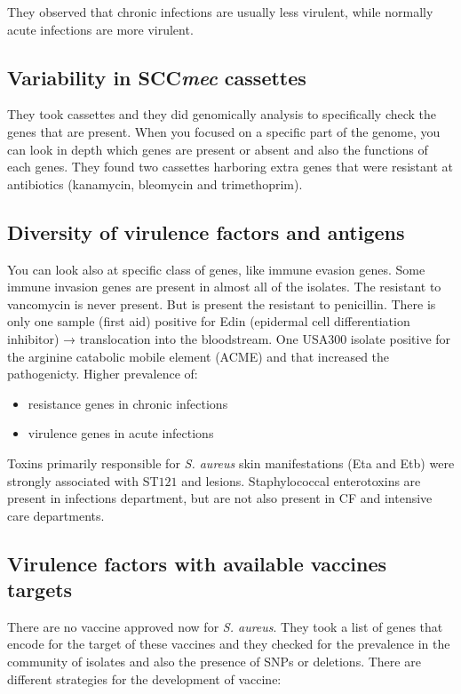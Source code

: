 They observed that chronic infections are usually less virulent, while normally acute infections are more virulent. 

\subsection{Variability in SCC\emph{mec} cassettes}

They took cassettes and they did genomically analysis to specifically check the genes that are present. When you focused on a specific part of the genome, you can look in depth which genes are present or absent and also the functions of each genes. They found two cassettes harboring extra genes that were resistant at antibiotics (kanamycin, bleomycin and trimethoprim). 

\subsection{Diversity of virulence factors and antigens}

You can look also at specific class of genes, like immune evasion genes. Some immune invasion genes are present in almost all of the isolates. The resistant to vancomycin is never present. But is present the resistant to penicillin. 
There is only one sample (first aid) positive for Edin (epidermal cell differentiation inhibitor) → translocation into the bloodstream.
One USA300 isolate positive for the arginine catabolic mobile element (ACME) and that increased the pathogenicty.
Higher prevalence of: 

\begin{itemize}
    \item resistance genes in chronic infections
    \item virulence genes in acute infections
\end{itemize}

Toxins primarily responsible for \emph{S. aureus} skin manifestations (Eta and Etb) were strongly associated with ST$121$ and lesions.
Staphylococcal enterotoxins are present in infections department, but are not also present in CF and intensive care departments. 

\subsection{Virulence factors with available vaccines targets}

There are no vaccine approved now for \emph{S. aureus}. They took a list of genes that encode for the target of these vaccines and they checked for the prevalence in the community of isolates and also the presence of SNPs or deletions.
There are different strategies for the development of vaccine: 

